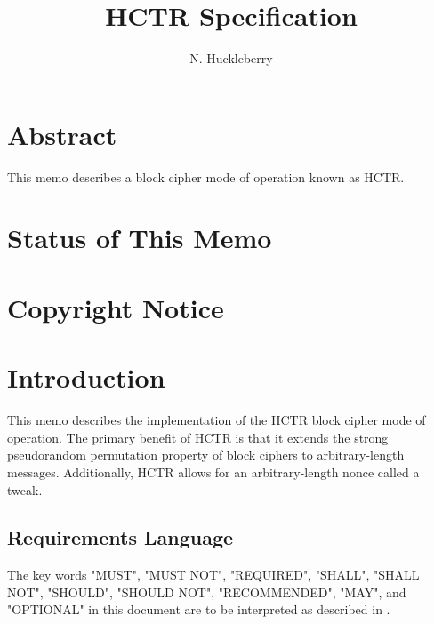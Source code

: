 \documentclass[i-d]{rfc}
\title{HCTR Specification}
\author{N. Huckleberry}
\begin{document}
\maketitle

\section*{Abstract}
This memo describes a block cipher mode of operation known as HCTR.

\section*{Status of This Memo}

\section*{Copyright Notice}

\tableofcontents

\section{Introduction}

This memo describes the implementation of the HCTR block cipher mode of operation. The primary benefit of HCTR is that it extends the strong pseudorandom permutation property of block ciphers to arbitrary-length messages. Additionally, HCTR allows for an arbitrary-length nonce called a tweak.

\subsection{Requirements Language}
The key words "MUST", "MUST NOT", "REQUIRED", "SHALL", "SHALL NOT",
   "SHOULD", "SHOULD NOT", "RECOMMENDED", "MAY", and "OPTIONAL" in this
   document are to be interpreted as described in \cite{RFC2119}.
\end{document}
